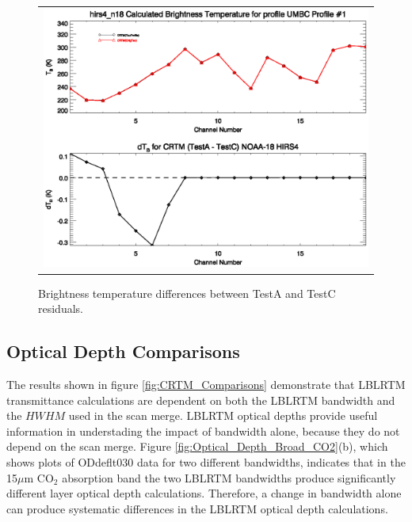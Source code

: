 \begin{figure}[htp]
  \centering{}
  \begin{tabular}{c}
    \includegraphics[bb=80 228 572 395, clip, scale=0.8]{./graphics/TestA_Versus_TestC.eps}
  \end{tabular}
  \caption{Brightness temperature differences between TestA and TestC residuals.}
  \label{fig:TestA_TestC}
\end{figure}


\subsection{Optical Depth Comparisons}

The results shown in figure \ref{fig:CRTM_Comparisons} demonstrate that LBLRTM transmittance calculations are dependent on both the LBLRTM bandwidth and the $HWHM$ used in the scan merge.  LBLRTM optical depths provide useful information in understading the impact of bandwidth alone, because they do not depend on the scan merge. Figure \ref{fig:Optical_Depth_Broad_CO2}(b), which shows plots of ODdeflt\textunderscore{}030 data for two different bandwidths, indicates that in the 15$\mu$m CO$_2$ absorption band the two LBLRTM bandwidths produce significantly different layer optical depth calculations. Therefore, a change in bandwidth alone can produce systematic differences in the 
LBLRTM optical depth calculations.

